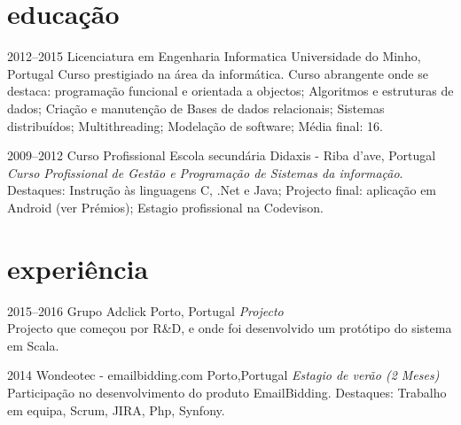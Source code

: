 \documentclass[]{friggeri-cv} %
\begin{document}
\section{educação}

\begin{entrylist}
\entry
{2012--2015}
{Licenciatura em Engenharia Informatica}
{Universidade do Minho, Portugal}
{Curso prestigiado na área da informática. Curso abrangente onde se destaca: programação funcional e orientada a objectos; Algoritmos e estruturas de dados; Criação e manutenção de Bases de dados relacionais; Sistemas distribuídos; Multithreading; Modelação de software; Média final: 16.}

\entry
{2009--2012}
{Curso Profissional {\normalfont Escola secundária}}
{Didaxis - Riba d'ave, Portugal}
{\emph{Curso Profissional de Gestão e Programação de Sistemas da informação}. Destaques: Instrução às linguagens C, .Net e Java; Projecto final: aplicação em Android (ver Prémios); Estagio profissional na Codevison.}

\end{entrylist}

\section{experiência}

\begin{entrylist}
\entry
{2015--2016}
{Grupo Adclick}
{Porto, Portugal}
{\emph{Projecto } \\
Projecto que começou por R\&D, e onde foi desenvolvido um protótipo do sistema em Scala. 
}

\entry
{2014}
{Wondeotec - {\normalfont emailbidding.com}}
{Porto,Portugal}
{\emph{Estagio de verão (2 Meses)} \\
Participação no desenvolvimento do produto EmailBidding. Destaques: Trabalho em equipa, Scrum, JIRA, Php, Synfony. }

\end{entrylist}
\end{document}

